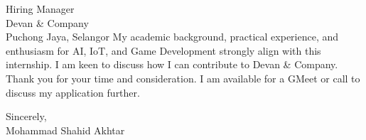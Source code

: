 \documentclass[10.5pt]{letter}
\begin{document}
\begin{letter}{Hiring Manager\\Devan \& Company\\Puchong Jaya, Selangor}
\vspace{0.5cm}
My academic background, practical experience, and enthusiasm for AI, IoT, and Game Development strongly align with this internship. I am keen to discuss how I can contribute to Devan & Company.  Thank you for your time and consideration. I am available for a GMeet or call to discuss my application further.

\vspace{0.5cm}

\begin{flushleft}
\vspace{0.3cm}
Sincerely,\\[2ex]
Mohammad Shahid Akhtar
\end{flushleft}

\end{letter}
\end{document}
